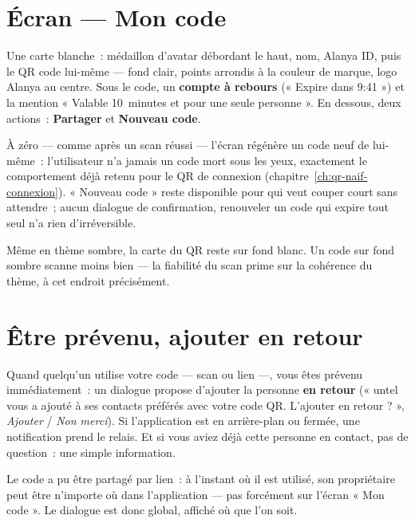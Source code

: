 \section{Écran --- Mon code}

Une carte blanche~: médaillon d'avatar débordant le haut, nom, Alanya ID, puis le QR
code lui-même --- fond clair, points arrondis à la couleur de marque, logo Alanya au
centre. Sous le code, un \textbf{compte à rebours} (« Expire dans 9:41 ») et la mention
« Valable 10~minutes et pour une seule personne ». En dessous, deux actions~:
\textbf{Partager} et \textbf{Nouveau code}.

À zéro --- comme après un scan réussi --- l'écran régénère un code neuf de lui-même~:
l'utilisateur n'a jamais un code mort sous les yeux, exactement le comportement déjà
retenu pour le QR de connexion (chapitre~\ref{ch:qr-naif-connexion}). « Nouveau code »
reste disponible pour qui veut couper court sans attendre~; aucun dialogue de
confirmation, renouveler un code qui expire tout seul n'a rien d'irréversible.

\begin{note}
Même en thème sombre, la carte du QR reste sur fond blanc. Un code sur fond sombre scanne
moins bien --- la fiabilité du scan prime sur la cohérence du thème, à cet endroit
précisément.
\end{note}

\section{Être prévenu, ajouter en retour}
\label{sec:qr-naif-retour}

Quand quelqu'un utilise votre code --- scan ou lien ---, vous êtes prévenu
immédiatement~: un dialogue propose d'ajouter la personne \textbf{en retour} (« untel
vous a ajouté à ses contacts préférés avec votre code QR. L'ajouter en retour ? »,
\emph{Ajouter} / \emph{Non merci}). Si l'application est en arrière-plan ou fermée, une
notification prend le relais. Et si vous aviez déjà cette personne en contact, pas de
question~: une simple information.

\begin{note}
Le code a pu être partagé par lien~: à l'instant où il est utilisé, son propriétaire
peut être n'importe où dans l'application --- pas forcément sur l'écran « Mon code ». Le
dialogue est donc global, affiché où que l'on soit.
\end{note}


